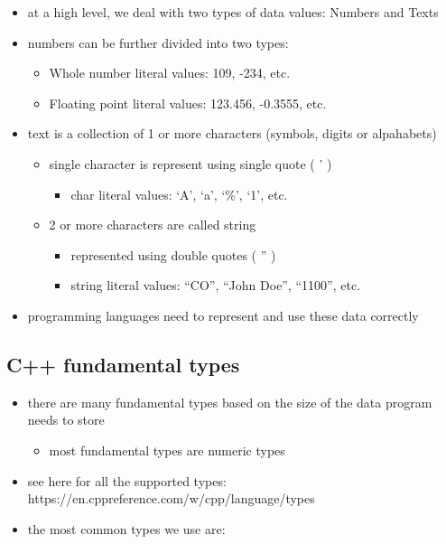 \documentclass[11pt]{article}
\providecommand{\tightlist}{%
      \setlength{\itemsep}{0pt}\setlength{\parskip}{0pt}}
\begin{document}
\begin{itemize}
\tightlist
\item
  at a high level, we deal with two types of data values: Numbers and
  Texts
\item
  numbers can be further divided into two types:

  \begin{itemize}
  \tightlist
  \item
    Whole number literal values: 109, -234, etc.
  \item
    Floating point literal values: 123.456, -0.3555, etc.
  \end{itemize}
\item
  text is a collection of 1 or more characters (symbols, digits or
  alpahabets)

  \begin{itemize}
  \tightlist
  \item
    single character is represent using single quote ( ' )

    \begin{itemize}
    \tightlist
    \item
      char literal values: `A', `a', `\%', `1', etc.
    \end{itemize}
  \item
    2 or more characters are called string

    \begin{itemize}
    \tightlist
    \item
      represented using double quotes ( '' )
    \item
      string literal values: ``CO'', ``John Doe'', ``1100'', etc.
    \end{itemize}
  \end{itemize}
\item
  programming languages need to represent and use these data correctly
\end{itemize}

\hypertarget{c-fundamental-types}{%
\subsection{C++ fundamental types}\label{c-fundamental-types}}

\begin{itemize}
\tightlist
\item
  there are many fundamental types based on the size of the data program
  needs to store

  \begin{itemize}
  \tightlist
  \item
    most fundamental types are numeric types
  \end{itemize}
\item
  see here for all the supported types:
  https://en.cppreference.com/w/cpp/language/types
\item
  the most common types we use are:
\end{itemize}
\end{document}
